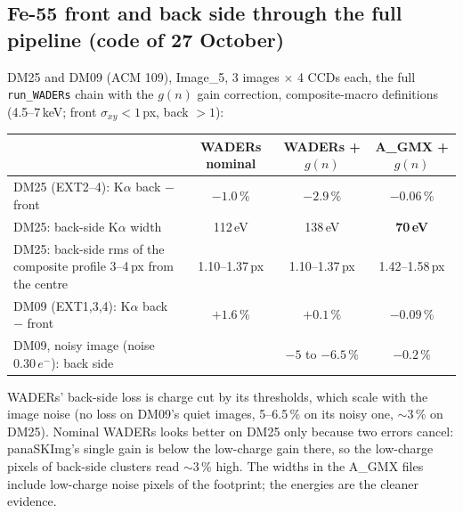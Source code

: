 \documentclass[11pt,a4paper]{article}
\newcommand{\el}{\ensuremath{e^-}}
\newcommand{\AGMX}{A\_GMX}
\newcommand{\code}[1]{\texttt{#1}}
\begin{document}
\subsection{Fe-55 front and back side through the full pipeline (code of 27 October)}
DM25 and DM09 (ACM 109), Image\_5, 3 images $\times$ 4 CCDs each, the full \code{run\_WADERs} chain with the $g(n)$ gain
correction, composite-macro definitions (4.5--7\,keV; front $\sigma_{xy}<1$\,px, back $>1$):
\begin{table}[H]\centering\small
\begin{tabular}{lccc}
\toprule
 & WADERs nominal & WADERs + $g(n)$ & \AGMX{} + $g(n)$ \\
\midrule
DM25 (EXT2--4): K$\alpha$ back $-$ front & $-1.0\,\%$ & $-2.9\,\%$ & $\mathbf{-0.06\,\%}$ \\
DM25: back-side K$\alpha$ width & 112\,eV & 138\,eV & \textbf{70\,eV} \\
DM25: back-side rms of the composite profile 3--4\,px from the centre & 1.10--1.37\,px & 1.10--1.37\,px & 1.42--1.58\,px \\
DM09 (EXT1,3,4): K$\alpha$ back $-$ front & $+1.6\,\%$ & $+0.1\,\%$ & $\mathbf{-0.09\,\%}$ \\
DM09, noisy image (noise 0.30\,\el): back side & & $-5$ to $-6.5\,\%$ & $\mathbf{-0.2\,\%}$ \\
\bottomrule
\end{tabular}
\end{table}
\noindent WADERs' back-side loss is charge cut by its thresholds, which scale with the image noise (no loss on DM09's quiet
images, 5--6.5\,\% on its noisy one, $\sim$3\,\% on DM25). Nominal WADERs looks better on DM25 only because two errors cancel:
panaSKImg's single gain is below the low-charge gain there, so the low-charge pixels of back-side clusters read $\sim$3\,\% high.
The widths in the \AGMX{} files include low-charge noise pixels of the footprint; the energies are the cleaner evidence.
\end{document}
